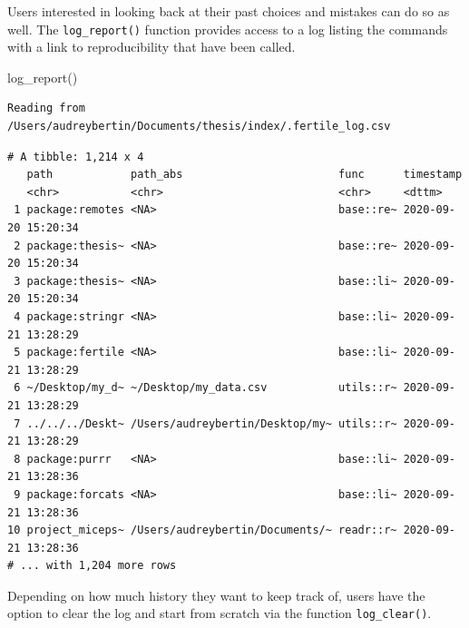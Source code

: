 \documentclass[12pt,twoside]{reedthesis}
\newenvironment{Shaded}{\begin{snugshade}}{\end{snugshade}}
\newcommand{\FunctionTok}[1]{\textcolor[rgb]{0.00,0.00,0.00}{#1}}
\newcommand{\NormalTok}[1]{#1}
\begin{document}
Users interested in looking back at their past choices and mistakes can do so as well. The \texttt{log\_report()} function provides access to a log listing the commands with a link to reproducibility that have been called.
\begin{Shaded}
\begin{Highlighting}[]
\FunctionTok{log\_report}\NormalTok{()}
\end{Highlighting}
\end{Shaded}
\footnotesize
\begin{verbatim}
Reading from /Users/audreybertin/Documents/thesis/index/.fertile_log.csv
\end{verbatim}
\begin{verbatim}
# A tibble: 1,214 x 4
   path            path_abs                        func      timestamp          
   <chr>           <chr>                           <chr>     <dttm>             
 1 package:remotes <NA>                            base::re~ 2020-09-20 15:20:34
 2 package:thesis~ <NA>                            base::re~ 2020-09-20 15:20:34
 3 package:thesis~ <NA>                            base::li~ 2020-09-20 15:20:34
 4 package:stringr <NA>                            base::li~ 2020-09-21 13:28:29
 5 package:fertile <NA>                            base::li~ 2020-09-21 13:28:29
 6 ~/Desktop/my_d~ ~/Desktop/my_data.csv           utils::r~ 2020-09-21 13:28:29
 7 ../../../Deskt~ /Users/audreybertin/Desktop/my~ utils::r~ 2020-09-21 13:28:29
 8 package:purrr   <NA>                            base::li~ 2020-09-21 13:28:36
 9 package:forcats <NA>                            base::li~ 2020-09-21 13:28:36
10 project_miceps~ /Users/audreybertin/Documents/~ readr::r~ 2020-09-21 13:28:36
# ... with 1,204 more rows
\end{verbatim}
\normalsize

Depending on how much history they want to keep track of, users have the option to clear the log and start from scratch via the function \texttt{log\_clear()}.
\end{document}
